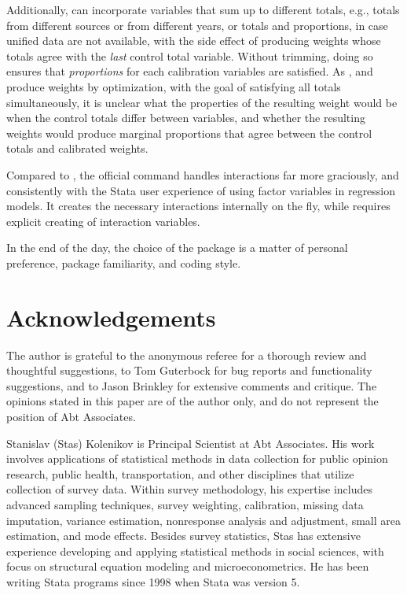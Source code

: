 Additionally,  can incorporate variables
that sum up to different totals, e.g., totals from different sources
or from different years, or totals and proportions, in case unified data
are not available, with the side effect of producing weights whose totals agree
with the \textit{last} control total variable. Without trimming, doing so ensures
that \textit{proportions} for each calibration variables are satisfied.
As ,
 and  produce weights by optimization,
with the goal of satisfying all totals simultaneously, it is unclear
what the properties of the resulting weight would be when the control totals
differ between variables, and whether the resulting weights would produce
marginal proportions that agree between the control totals and calibrated weights.

Compared to , the official  command handles
interactions far more graciously, and consistently with the Stata user experience
of using factor variables in regression models. It creates the necessary interactions
internally on the fly, while  requires explicit creating of interaction
variables.

In the end of the day,
the choice of the package is a matter of personal preference, package familiarity,
and coding style.











\section*{Acknowledgements}

The author is grateful
to the anonymous referee for a thorough review and thoughtful suggestions,
to Tom Guterbock for bug reports and functionality suggestions,
and to Jason Brinkley for extensive comments and critique.
The opinions stated in this paper
are of the author only, and do not represent the position of Abt Associates.



% 

\begin{aboutauthor}
  Stanislav (Stas) Kolenikov is Principal Scientist at Abt Associates.
  His work involves applications of statistical methods in data collection
  for public opinion research, public health, transportation, and other disciplines
  that utilize collection of survey data.
  Within survey methodology, his expertise includes advanced sampling techniques,
  survey weighting, calibration, missing data imputation, variance estimation,
  nonresponse analysis and adjustment, small area estimation, and mode effects.
  Besides survey statistics, Stas has extensive experience developing and applying
  statistical methods in social sciences, with focus on structural equation
  modeling and microeconometrics. He has been writing Stata programs since
  1998 when Stata was version 5.
\end{aboutauthor}
